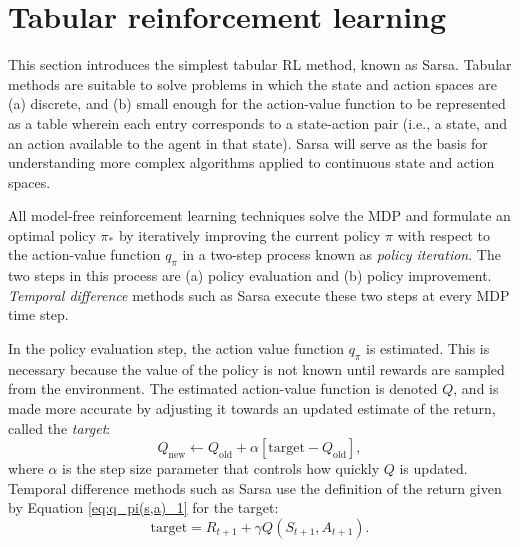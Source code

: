 \section{Tabular reinforcement learning}
This section introduces the simplest tabular RL method, known as Sarsa.
Tabular methods are suitable to solve problems in which the state and action spaces are (a) discrete, and (b) small enough for the action-value function to be represented as a table wherein each entry corresponds to a state-action pair (i.e., a state, and an action available to the agent in that state).
Sarsa will serve as the basis for understanding more complex algorithms applied to continuous state and action spaces.

All model-free reinforcement learning techniques solve the MDP and formulate an optimal policy $\pi_*$ by iteratively improving the current policy $\pi$ with respect to the action-value function $q_\pi$ in a two-step process known as \emph{policy iteration}.
The two steps in this process are (a) policy evaluation and (b) policy improvement.
\emph{Temporal difference} methods such as Sarsa execute these two steps at every MDP time step.

In the policy evaluation step, the action value function $q_\pi$ is estimated.
This is necessary because the value of the policy is not known until rewards are sampled from the environment.
The estimated action-value function is denoted $Q$, and is made more accurate by adjusting it towards an updated estimate of the return, called the \emph{target}:
\begin{equation}\label{eq:tab_policy_eval}
    Q_{\text{new}} \leftarrow  Q_{\text{old}} + \alpha [\text{target} - Q_{\text{old}}],
\end{equation}
where $\alpha$ is the step size parameter that controls how quickly $Q$ is updated.
Temporal difference methods such as Sarsa use the definition of the return given by Equation \ref{eq:q_pi(s,a)_1} for the target:
\begin{equation}\label{eq:sarsa_target}
    \text{target} = R_{t+1} + \gamma Q(S_{t+1}, A_{t+1}).
\end{equation}

